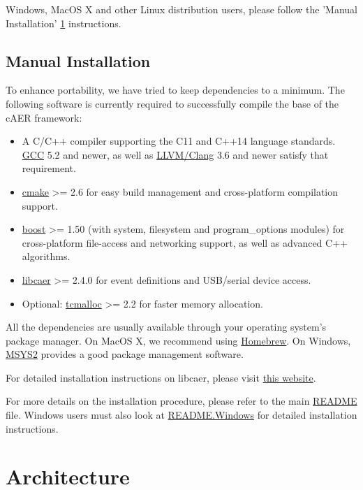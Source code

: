 \documentclass[a4paper,12pt]{report}
\begin{document}
Windows, MacOS X and other Linux distribution users, please follow the 'Manual Installation' \ref{sec:manual_installation} instructions.

\section{Manual Installation} \label{sec:manual_installation}

To enhance portability, we have tried to keep dependencies to a minimum.
The following software is currently required to successfully compile the base of the cAER framework:
\begin{itemize}
\item A C/C++ compiler supporting the C11 and C++14 language standards. \href{https://gcc.gnu.org/}{GCC} 5.2 and newer, as well as \href{https://clang.llvm.org/}{LLVM/Clang} 3.6 and newer satisfy that requirement.
\item \href{https://cmake.org/}{cmake} >= 2.6 for easy build management and cross-platform compilation support.
\item \href{http://www.boost.org/}{boost} >= 1.50 (with system, filesystem and program\_options modules) for cross-platform file-access and networking support, as well as advanced C++ algorithms.
\item \href{https://github.com/inilabs/libcaer}{libcaer} >= 2.4.0 for event definitions and USB/serial device access.
\item Optional: \href{https://github.com/gperftools/gperftools}{tcmalloc} >= 2.2 for faster memory allocation.
\end{itemize}

All the dependencies are usually available through your operating system's package manager.
On MacOS X, we recommend using \href{https://brew.sh/}{Homebrew}.
On Windows, \href{http://www.msys2.org/}{MSYS2} provides a good package management software.

For detailed installation instructions on libcaer, please visit \href{https://inilabs.com/support/software/libcaer/}{this website}.

For more details on the installation procedure, please refer to the main \href{https://raw.githubusercontent.com/inilabs/caer/master/README.md}{README} file.
Windows users must also look at \href{https://raw.githubusercontent.com/inilabs/caer/master/README.Windows}{README.Windows} for detailed installation instructions.

\chapter{Architecture} \label{chap:architecture}
\end{document}
